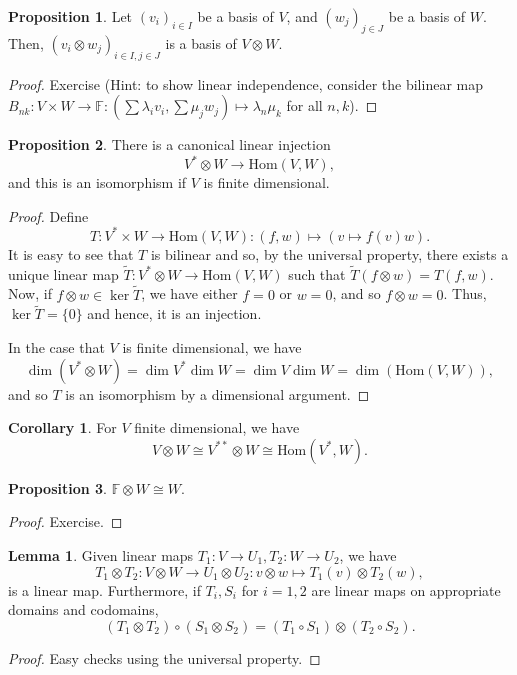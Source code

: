 \documentclass[]{article}
\theoremstyle{definition}
\newtheorem{corollary}{Corollary}[theorem]
\theoremstyle{definition}
\newtheorem{lemma}{Lemma}[section]
\newtheorem{proposition}{Proposition}[section]
\begin{document}
\begin{proposition}
  Let \((v_i)_{i \in I}\) be a basis of \(V\), and \((w_j)_{j \in J}\) be a basis 
  of \(W\). Then, \((v_i \otimes w_j)_{i \in I, j \in J}\) is a basis of 
  \(V \otimes W\).
\end{proposition}
\begin{proof}
  Exercise (Hint: to show linear independence, consider the bilinear map 
  \(B_{nk} : V \times W \to \mathbb{F} : 
  \left(\sum \lambda_i v_i, \sum \mu_j w_j\right) \mapsto \lambda_n \mu_k\) 
  for all \(n, k\)). 
\end{proof}

\begin{proposition}
  There is a canonical linear injection 
  \[V^* \otimes W \to \text{Hom}(V, W),\]
  and this is an isomorphism if \(V\) is finite dimensional.
\end{proposition}
\begin{proof}
  Define 
  \[T : V^* \times W \to \text{Hom}(V, W) : (f, w) \mapsto (v \mapsto f(v)w).\]
  It is easy to see that \(T\) is bilinear and so, by the universal property, 
  there exists a unique linear map \(\tilde T : V^* \otimes W \to \text{Hom}(V, W)\) 
  such that \(\tilde T(f \otimes w) = T(f, w)\). Now, if 
  \(f \otimes w \in \ker \tilde T\), we have either \(f = 0\) or \(w = 0\), and 
  so \(f \otimes w = 0\). Thus, \(\ker \tilde T = \{0\}\) and hence, it is an 
  injection.

  In the case that \(V\) is finite dimensional, we have 
  \[\dim (V^* \otimes W) = \dim V^* \dim W = \dim V \dim W = \dim(\text{Hom}(V, W)),\]
  and so \(T\) is an isomorphism by a dimensional argument.
\end{proof}

\begin{corollary}
  For \(V\) finite dimensional, we have
  \[V \otimes W \cong V^{**} \otimes W \cong \text{Hom}(V^*, W).\]
\end{corollary}

\begin{proposition}
  \(\mathbb{F} \otimes W \cong W\).
\end{proposition}
\begin{proof}
  Exercise.
\end{proof}

\begin{lemma}\label{tensor_map}
  Given linear maps \(T_1 : V \to U_1, T_2 : W \to U_2\), we have 
  \[T_1 \otimes T_2 : V \otimes W \to U_1 \otimes U_2 : 
    v \otimes w \mapsto T_1(v) \otimes T_2(w),\]
  is a linear map. Furthermore, if \(T_i, S_i\) for \(i = 1, 2\) 
  are linear maps on appropriate domains and codomains, 
  \[(T_1 \otimes T_2) \circ (S_1 \otimes S_2) = 
    (T_1 \circ S_1) \otimes (T_2 \circ S_2).\]
\end{lemma}
\begin{proof}
  Easy checks using the universal property.
\end{proof}
\end{document}

